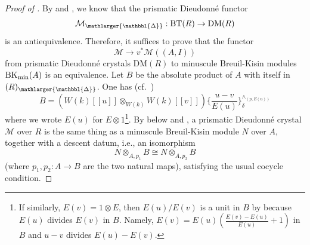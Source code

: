 \documentclass{amsart}
\newcommand{\prism}{{\mathlarger{\mathbbl{\Delta}}}}
\theoremstyle{plain}
\theoremstyle{definition}
\newcommand{\BT}{\mathrm{BT}}
\begin{document}
\begin{proof}[Proof of ]
By  and , we know that the prismatic Dieudonn\'e functor 
\[ \mathcal{M}_{\prism} : \BT(R) \to \mathrm{DM}(R) \]
is an antiequivalence. Therefore, it suffices to prove that the functor
\[ \mathcal{M} \to v^* \mathcal{M}((A,I))  \]
from prismatic Dieudonn\'e crystals $\mathrm{DM}(R)$ to minuscule Breuil-Kisin modules $\mathrm{BK}_{\rm min}(A)$ is an equivalence.
Let $B$ be the absolute product of $A$ with itself in $(R)_{\prism}$. One has (cf.\ \cite[Proposition 3.13]{bhatt_scholze_prisms_and_prismatic_cohomology})
\[ B= \left(W(k)[[u]] \otimes_{W(k)} W(k)[[v]] \right)\{ \frac{u-v}{E(u)} \}_{\delta}^{\wedge_{(p,E(u))}} \]
where we wrote $E(u)$ for $E\otimes 1$\footnote{If similarly, $E(v)=1\otimes E$, then $E(u)/E(v)$ is a unit in $B$ by \cite[Lemma 2.24]{bhatt_scholze_prisms_and_prismatic_cohomology} because $E(u)$ divides $E(v)$ in $B$. Namely, $E(v)=E(u)(\frac{E(v)-E(u)}{E(u)}+1)$ in $B$ and $u-v$ divides $E(u)-E(v)$.}.
By  below and , a prismatic Dieudonn\'e crystal $\mathcal{M}$ over $R$ is the same thing as a minuscule Breuil-Kisin module $N$ over $A$, together with a descent datum, i.e., an isomorphism
$$
N \otimes_{A,p_1} B \cong N \otimes_{A,p_2} B
$$
(where $p_1, p_2 : A \to B$ are the two natural maps), satisfying the usual cocycle condition. 


\end{proof}
\end{document}
